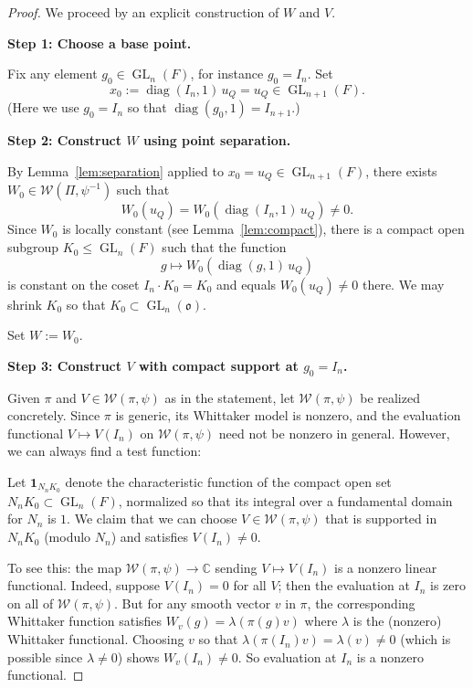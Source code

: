 \documentclass[12pt]{article}
\theoremstyle{definition}
\DeclareMathOperator{\diag}{diag}
\DeclareMathOperator{\GL}{GL}
\begin{document}
\begin{proof}
We proceed by an explicit construction of $W$ and $V$.

\medskip
\noindent\textbf{Step 1: Choose a base point.}

Fix any element $g_0 \in \GL_n(F)$, for instance $g_0 = I_n$. Set
\[
  x_0 := \diag(I_n, 1)\, u_Q = u_Q \in \GL_{n+1}(F).
\]
(Here we use $g_0 = I_n$ so that $\diag(g_0, 1) = I_{n+1}$.)

\medskip
\noindent\textbf{Step 2: Construct $W$ using point separation.}

By Lemma~\ref{lem:separation} applied to $x_0 = u_Q \in \GL_{n+1}(F)$, there exists
$W_0 \in \mathcal{W}(\Pi, \psi^{-1})$ such that
\[
  W_0(u_Q) = W_0\!\left(\diag(I_n, 1)\, u_Q\right) \neq 0.
\]
Since $W_0$ is locally constant (see Lemma~\ref{lem:compact}), there is a compact open
subgroup $K_0 \leq \GL_n(F)$ such that the function
\[
  g \mapsto W_0(\diag(g,1)\,u_Q)
\]
is constant on the coset $I_n \cdot K_0 = K_0$ and equals $W_0(u_Q) \neq 0$ there.
We may shrink $K_0$ so that $K_0 \subset \GL_n(\mathfrak{o})$.

Set $W := W_0$.

\medskip
\noindent\textbf{Step 3: Construct $V$ with compact support at $g_0 = I_n$.}

Given $\pi$ and $V \in \mathcal{W}(\pi, \psi)$ as in the statement, let $\mathcal{W}(\pi, \psi)$
be realized concretely. Since $\pi$ is generic, its Whittaker model is nonzero, and the
evaluation functional $V \mapsto V(I_n)$ on $\mathcal{W}(\pi, \psi)$ need not be nonzero
in general. However, we can always find a test function:

Let $\mathbf{1}_{N_n K_0}$ denote the characteristic function of the compact open set
$N_n K_0 \subset \GL_n(F)$, normalized so that its integral over a fundamental domain for
$N_n$ is $1$. We claim that we can choose $V \in \mathcal{W}(\pi, \psi)$ that is
supported in $N_n K_0$ (modulo $N_n$) and satisfies $V(I_n) \neq 0$.

To see this: the map $\mathcal{W}(\pi, \psi) \to \mathbb{C}$ sending $V \mapsto V(I_n)$
is a nonzero linear functional. Indeed, suppose $V(I_n) = 0$ for all $V$; then the
evaluation at $I_n$ is zero on all of $\mathcal{W}(\pi, \psi)$. But for any smooth
vector $v$ in $\pi$, the corresponding Whittaker function satisfies
$W_v(g) = \lambda(\pi(g)v)$ where $\lambda$ is the (nonzero) Whittaker functional.
Choosing $v$ so that $\lambda(\pi(I_n)v) = \lambda(v) \neq 0$ (which is possible since
$\lambda \neq 0$) shows $W_v(I_n) \neq 0$. So evaluation at $I_n$ is a nonzero functional.


\end{proof}
\end{document}
